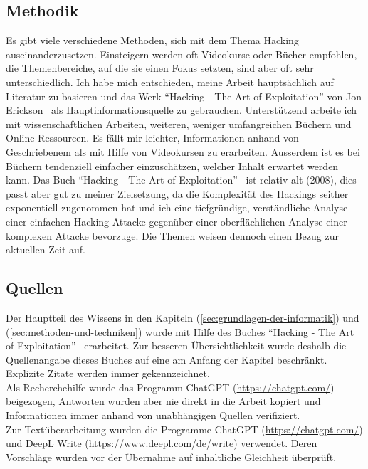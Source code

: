 \documentclass[11pt, a4paper]{article}
\begin{document}
\subsection{Methodik}
Es gibt viele verschiedene Methoden, sich mit dem Thema Hacking auseinanderzusetzen. Einsteigern werden oft Videokurse oder Bücher empfohlen, die Themenbereiche, auf die sie einen Fokus setzten, sind aber oft sehr unterschiedlich. Ich habe mich entschieden, meine Arbeit hauptsächlich auf Literatur zu basieren und das Werk ``Hacking - The Art of Exploitation'' von Jon Erickson~\cite{erickson2008hacking} als Hauptinformationsquelle zu gebrauchen. Unterstützend arbeite ich mit wissenschaftlichen Arbeiten, weiteren, weniger umfangreichen Büchern und Online-Ressourcen. Es fällt mir leichter, Informationen anhand von Geschriebenem als mit Hilfe von Videokursen zu erarbeiten. Ausserdem ist es bei Büchern tendenziell einfacher einzuschätzen, welcher Inhalt erwartet werden kann. Das Buch ``Hacking - The Art of Exploitation''~\cite{erickson2008hacking} ist relativ alt (2008), dies passt aber gut zu meiner Zielsetzung, da die Komplexität des Hackings seither exponentiell zugenommen hat und ich eine tiefgründige, verständliche Analyse einer einfachen Hacking-Attacke gegenüber einer oberflächlichen Analyse einer komplexen Attacke bevorzuge. Die Themen weisen dennoch einen Bezug zur aktuellen Zeit auf.

\subsection{Quellen}
Der Hauptteil des Wissens in den Kapiteln  (\ref{sec:grundlagen-der-informatik}) und  (\ref{sec:methoden-und-techniken}) wurde mit Hilfe des Buches ``Hacking - The Art of Exploitation''~\cite{erickson2008hacking} erarbeitet. Zur besseren Übersichtlichkeit wurde deshalb die Quellenangabe dieses Buches auf eine am Anfang der Kapitel beschränkt. Explizite Zitate werden immer gekennzeichnet. \\ Als Recherchehilfe wurde das Programm ChatGPT (\url{https://chatgpt.com/}) beigezogen, Antworten wurden aber nie direkt in die Arbeit kopiert und Informationen immer anhand von unabhängigen Quellen verifiziert. \\ Zur Textüberarbeitung wurden die Programme ChatGPT (\url{https://chatgpt.com/}) und DeepL Write (\url{https://www.deepl.com/de/write}) verwendet. Deren Vorschläge wurden vor der Übernahme auf inhaltliche Gleichheit überprüft.
\end{document}
